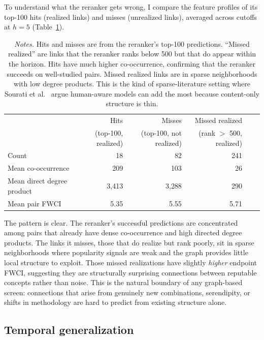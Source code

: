 \documentclass[11pt]{article}
\newcommand{\fignotes}[1]{\caption*{\textit{Notes.} #1}}
\begin{document}
To understand what the reranker gets wrong, I compare the feature profiles of its top-100 hits (realized links) and misses (unrealized links), averaged across cutoffs at \(h=5\) (Table~\ref{tab:failure-modes}).

\begin{table}[h]
  \caption{Failure modes in the reranker's top 100 (\(h=5\))}
  \label{tab:failure-modes}
  \centering
  \begin{tabular}{lrrrrr}
    \toprule
    & Hits & Misses & Missed realized \\
    & (top-100, realized) & (top-100, not realized) & (rank $>$ 500, realized) \\
    \midrule
    Count & 18 & 82 & 241 \\
    Mean co-occurrence & 209 & 103 & 26 \\
    Mean direct degree product & 3{,}413 & 3{,}288 & 290 \\
    Mean pair FWCI & 5.35 & 5.55 & 5.71 \\
    \bottomrule
  \end{tabular}
  \fignotes{Hits and misses are from the reranker's top-100 predictions. ``Missed realized'' are links that the reranker ranks below 500 but that do appear within the horizon. Hits have much higher co-occurrence, confirming that the reranker succeeds on well-studied pairs. Missed realized links are in sparse neighborhoods with low degree products. This is the kind of sparse-literature setting where Sourati et al.~\citeyearpar{sourati2023accelerating} argue human-aware models can add the most because content-only structure is thin.}
\end{table}

The pattern is clear. The reranker's successful predictions are concentrated among pairs that already have dense co-occurrence and high directed degree products. The links it misses, those that do realize but rank poorly, sit in sparse neighborhoods where popularity signals are weak and the graph provides little local structure to exploit. Those missed realizations have slightly \emph{higher} endpoint FWCI, suggesting they are structurally surprising connections between reputable concepts rather than noise. This is the natural boundary of any graph-based screen: connections that arise from genuinely new combinations, serendipity, or shifts in methodology are hard to predict from existing structure alone.

\subsection{Temporal generalization}
\label{app:temporal-generalization}
\end{document}
